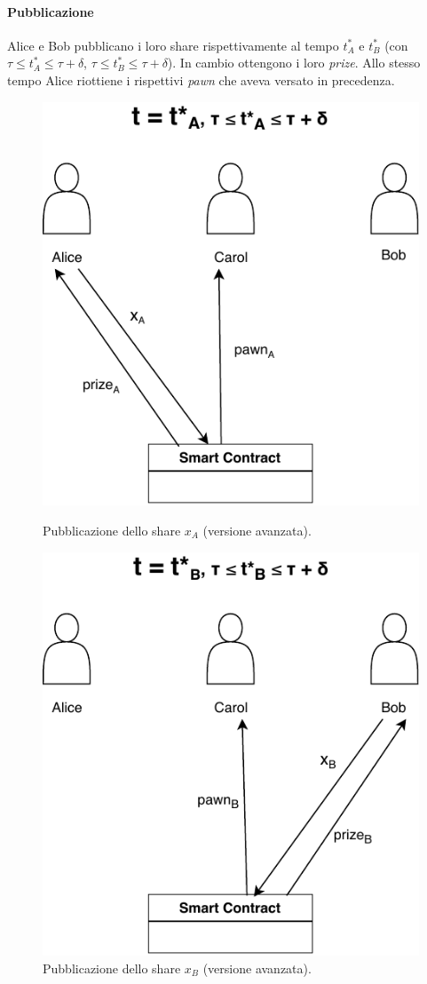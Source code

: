 \paragraph{Pubblicazione}
Alice e Bob pubblicano i loro share rispettivamente al tempo $ t^*_A $ e $ t^*_B $
(con $ \tau \leq t^*_A \leq \tau + \delta $, $ \tau \leq t^*_B \leq \tau + \delta $).
In cambio ottengono i loro
\textit{prize}.
Allo stesso tempo Alice riottiene i rispettivi \textit{pawn} che aveva versato
in precedenza.
\begin{figure}[H]
	\begin{minipage}{0.45\textwidth}
		\centering
		\includegraphics[width=.7\linewidth]{images/chap_protocollo/avanzato-pubblicazione-a.pdf}
		\caption{Pubblicazione dello share $ x_A $ (versione avanzata).}
	\end{minipage}\hfill
	\begin{minipage}{0.45\textwidth}
		\centering
		\includegraphics[width=.7\linewidth]{images/chap_protocollo/avanzato-pubblicazione-b.pdf}
		\caption{Pubblicazione dello share $ x_B $ (versione avanzata).}
	\end{minipage}
\end{figure}

